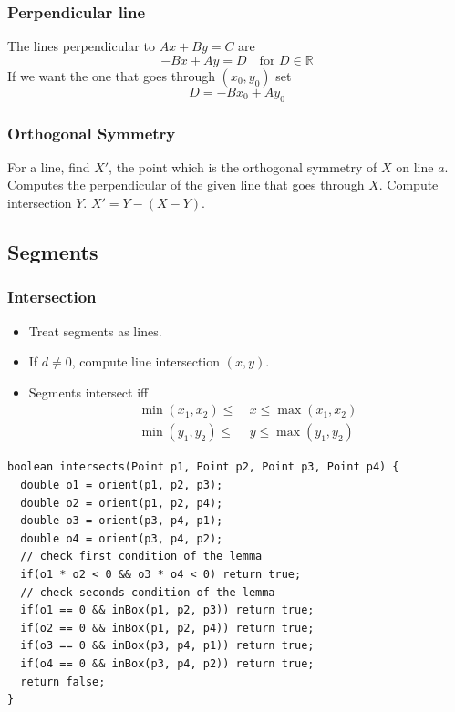\subsubsection{Perpendicular line}
The lines perpendicular to $Ax + By = C$ are
$$-Bx + Ay = D \quad \text{for $D \in \mathbb{R}$}$$
If we want the one that goes through $(x_0, y_0)$ set
$$D = - B x_0 + A y_0$$
\subsubsection{Orthogonal Symmetry}
For a line, find $X'$, the point which is the orthogonal symmetry of $X$ on line $a$. \\
Computes the perpendicular of the given line that goes through $X$. Compute intersection $Y$. $X' = Y - (X - Y)$.
\subsection{Segments}
\subsubsection{Intersection}
\begin{itemize}
\item Treat segments as lines.
\item If $d \neq 0$, compute line intersection $(x, y)$.
\item Segments intersect iff
\begin{align*}
\min(x_1, x_2) \leq & \ x \leq \max(x_1, x_2) \\
\min(y_1, y_2) \leq & \ y \leq \max(y_1, y_2)
\end{align*}
\end{itemize}
\begin{lstlisting}
boolean intersects(Point p1, Point p2, Point p3, Point p4) {
  double o1 = orient(p1, p2, p3);
  double o2 = orient(p1, p2, p4);
  double o3 = orient(p3, p4, p1);
  double o4 = orient(p3, p4, p2);
  // check first condition of the lemma
  if(o1 * o2 < 0 && o3 * o4 < 0) return true;
  // check seconds condition of the lemma
  if(o1 == 0 && inBox(p1, p2, p3)) return true;
  if(o2 == 0 && inBox(p1, p2, p4)) return true;
  if(o3 == 0 && inBox(p3, p4, p1)) return true;
  if(o4 == 0 && inBox(p3, p4, p2)) return true;
  return false;
}
\end{lstlisting}
